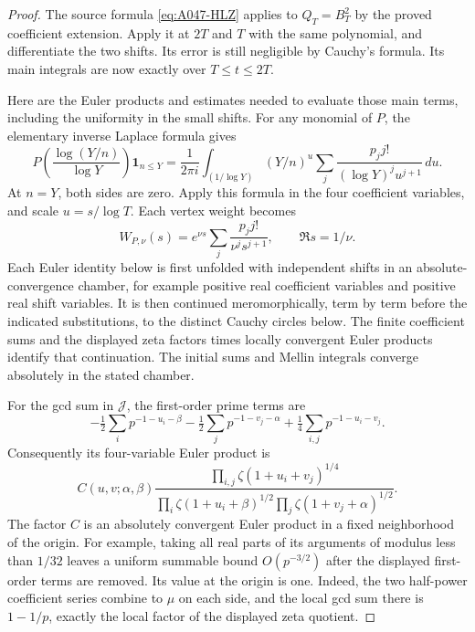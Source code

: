 \begin{proof}
The source formula \eqref{eq:A047-HLZ} applies to \(Q_T=B_T^2\)
by the proved coefficient extension.  Apply it at \(2T\)
and \(T\) with the same polynomial, and differentiate the
two shifts.  Its error is still negligible by Cauchy's
formula.  Its main integrals are now exactly over
\(T\le t\le2T\).

Here are the Euler products and estimates needed to evaluate
those main terms, including the uniformity in the small shifts.
For any monomial of \(P\), the elementary inverse Laplace
formula gives
\[
 P\left(\frac{\log(Y/n)}{\log Y}\right)\mathbf1_{n\le Y}
 =\frac1{2\pi i}\int_{(1/\log Y)}
 (Y/n)^u\sum_j\frac{p_jj!}{(\log Y)^j u^{j+1}}\,du .
\]
At \(n=Y\), both sides are zero.  Apply this formula in the
four coefficient variables, and scale \(u=s/\log T\).
Each vertex weight becomes
\[
             W_{P,\nu}(s)
                  =e^{\nu s}\sum_j\frac{p_jj!}{\nu^j s^{j+1}},
                  \qquad\Re s=1/\nu .
\]
Each Euler identity below is first unfolded with independent
shifts in an absolute-convergence chamber, for example positive
real coefficient variables and positive real shift variables.
It is then continued meromorphically, term by term before the
indicated substitutions, to the distinct Cauchy circles below.
The finite coefficient sums and the displayed zeta factors
times locally convergent Euler products identify that
continuation.  The initial sums and Mellin integrals converge
absolutely in the stated chamber.

For the gcd sum in \(\mathcal J\), the first-order prime
terms are
\[
 -\tfrac12\sum_i p^{-1-u_i-\beta}
 -\tfrac12\sum_j p^{-1-v_j-\alpha}
 +\tfrac14\sum_{i,j}p^{-1-u_i-v_j}.
\]
Consequently its four-variable Euler product is
\begin{equation}\label{eq:A047-F-euler}
 C(u,v;\alpha,\beta)
 \frac{\prod_{i,j}\zeta(1+u_i+v_j)^{1/4}}
      {\prod_i\zeta(1+u_i+\beta)^{1/2}
       \prod_j\zeta(1+v_j+\alpha)^{1/2}}.
\end{equation}
The factor \(C\) is an absolutely convergent Euler product
in a fixed neighborhood of the origin.  For example,
taking all real parts of its arguments of modulus less
than \(1/32\) leaves a uniform summable bound
\(O(p^{-3/2})\) after the displayed first-order terms
are removed.  Its value at the origin is one.
Indeed, the two half-power coefficient series combine
to \(\mu\) on each side, and the local gcd sum there is
\(1-1/p\), exactly the local factor of the displayed
zeta quotient.


\end{proof}
